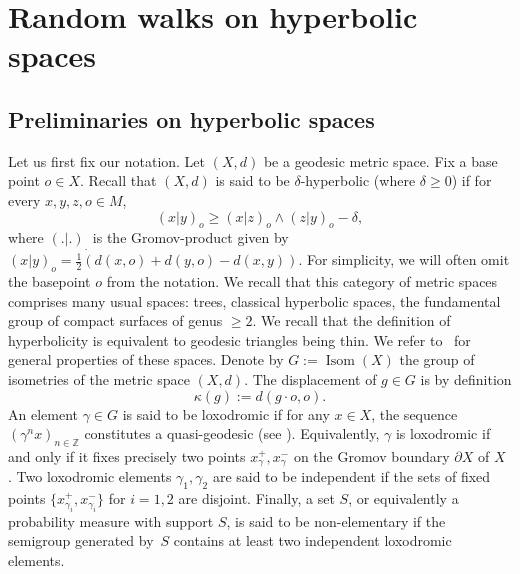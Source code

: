 \documentclass[10pt]{amsart}
\theoremstyle{plain}
\theoremstyle{definition}
\newcommand\Z{\mathbb{Z}}
\DeclareMathOperator\Isom{Isom}
\begin{document}
\section{Random walks on hyperbolic spaces}\label{sec.hyperbolic}

\subsection{Preliminaries on hyperbolic spaces}\label{subsec.hyperbolic}
Let us first fix our notation.
Let $(X,d)$ be a geodesic metric space. Fix a base point $o\in X$. Recall that $(X,d)$ is said to be $\delta$-hyperbolic (where $\delta\geq 0$) if
for every $x,y,z,o \in M$,
\begin{equation}\label{eq.defining.eq}
(x|y)_o \geq (x|z)_o \wedge (z|y)_o -\delta,
\end{equation}
where $(.|.)_.$ is the Gromov-product given by $(x|y)_o=\frac{1}{2}(d(x,o)+d(y,o)-d(x,y))$. For simplicity, we will often omit the basepoint $o$ from the notation.
We recall that this category of metric spaces comprises many usual spaces: trees, classical hyperbolic spaces, the fundamental group of compact surfaces of genus $\geq 2$. We recall that the definition of hyperbolicity is equivalent to geodesic triangles being thin. We refer to~\cite{hyperbolic-book} for general properties of these spaces. Denote by $G:=\Isom(X)$ the group of isometries of the metric space $(X,d)$. The displacement of $g\in G$ is by definition
\[
\kappa(g):=d(g\cdot o, o).
\]
An element $\gamma \in G$ is said to be loxodromic if for any $x \in X$, the sequence $(\gamma^nx)_{n \in \Z}$ constitutes a quasi-geodesic (see \cite[Ch.\,3]{hyperbolic-book}). Equivalently, $\gamma$ is loxodromic if and only if it fixes precisely two points $x_\gamma^+,x_\gamma^-$ on the Gromov boundary $\partial X$ of $X$ \cite[Ch.\,9 \& 10]{hyperbolic-book}. Two loxodromic elements $\gamma_1,\gamma_2$ are said to be independent if the sets of fixed points $\{x^+_{\gamma_i} ,x^-_{\gamma_i}\}$ for $i=1,2$ are disjoint. Finally, a set $S$, or equivalently a probability measure with support $S$, is said to be non-elementary if the semigroup generated by~$S$ contains at least two independent loxodromic elements.
\end{document}
